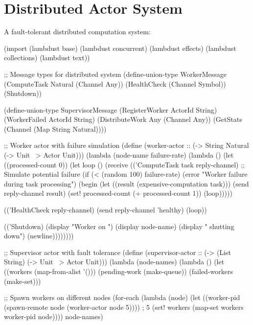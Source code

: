 \section{Distributed Actor System}
\label{sec:distributed-actors}

A fault-tolerant distributed computation system:

\begin{example}
\begin{lambdustcode}
(import (lambdust base)
        (lambdust concurrent)
        (lambdust effects)
        (lambdust collections)
        (lambdust text))

;; Message types for distributed system
(define-union-type WorkerMessage
  (ComputeTask Natural (Channel Any))
  (HealthCheck (Channel Symbol))
  (Shutdown))

(define-union-type SupervisorMessage  
  (RegisterWorker ActorId String)
  (WorkerFailed ActorId String)
  (DistributeWork Any (Channel Any))
  (GetStats (Channel (Map String Natural))))

;; Worker actor with failure simulation
(define (worker-actor :: (-> String Natural (-> Unit ~> {Actor} Unit)))
  (lambda (node-name failure-rate)
    (lambda ()
      (let ((processed-count 0))
        (let loop ()
          (receive
            (('ComputeTask task reply-channel)
             ;; Simulate potential failure
             (if (< (random 100) failure-rate)
                 (error "Worker failure during task processing")
                 (begin
                   (let ((result (expensive-computation task)))
                     (send reply-channel result)
                     (set! processed-count (+ processed-count 1))
                     (loop)))))
            
            (('HealthCheck reply-channel)
             (send reply-channel 'healthy)
             (loop))
            
            (('Shutdown)
             (display "Worker on ") (display node-name) (display " shutting down") (newline))))))))

;; Supervisor actor with fault tolerance
(define (supervisor-actor :: (-> (List String) (-> Unit ~> {Actor} Unit)))
  (lambda (node-names)
    (lambda ()
      (let ((workers (map-from-alist '()))
            (pending-work (make-queue))
            (failed-workers (make-set)))
        
        ;; Spawn workers on different nodes
        (for-each 
          (lambda (node)
            (let ((worker-pid (spawn-remote node (worker-actor node 5))))  ; 5%
              (set! workers (map-set workers worker-pid node))))
          node-names)
        

\end{lambdustcode}
\end{example}

